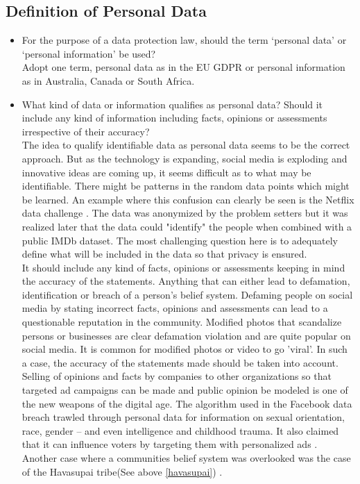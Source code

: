 \subsection{Definition of Personal Data}
\begin{itemize}
	\item For the purpose of a data protection law, should the term  ‘personal data’ or  ‘personal information’ be used?
	\\
	Adopt one term, personal data as in the EU GDPR or personal information as in Australia, Canada or South Africa.
	\item What kind of data or information qualifies as personal data? Should it include any kind of information including facts, opinions or assessments irrespective of their accuracy?
	\\
	The idea to qualify identifiable data as personal data seems to be the correct approach. But as the technology is expanding, social media is exploding and innovative ideas are coming up, it seems difficult as to what may be identifiable. There might be patterns in the random data points which might be learned. An example where this confusion can clearly be seen is the Netflix data challenge \cite{netflix}.
	The data was anonymized by the problem setters but it was realized later that the data could "identify" the people when combined with a public IMDb dataset. The most challenging question here is to adequately define what will be included in the data so that privacy is ensured. 
	\\
	It should include any kind of facts, opinions or assessments keeping in mind the accuracy of the statements. Anything that can either lead to defamation, identification or breach of a person's belief system. Defaming people on social media by stating incorrect facts, opinions and assessments can lead to a questionable reputation in the community. Modified photos that scandalize persons or businesses are clear defamation violation and are quite popular on social media. It is common for modified photos or video to go 'viral'. In such a case, the accuracy of the statements made should be taken into account.
	\\ 
	Selling of opinions and facts by companies to other organizations so that targeted ad campaigns can be made and public opinion be modeled is one of the new weapons of the digital age. The algorithm used in the Facebook data breach trawled through personal data for information on sexual orientation, race, gender – and even intelligence and childhood trauma. It also claimed that it can influence voters by targeting them with personalized ads \cite{cambana}. Another case where a communities belief system was overlooked was the case of the Havasupai tribe(See above \ref{havasupai}) \cite{havasupai1, havasupai2}. 

\end{itemize}
